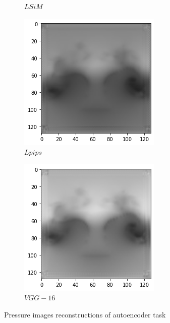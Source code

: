 \documentclass[a4paper,12pt,twoside]{report}
\begin{document}
\begin{figure}
\begin{subfigure}{0.19\textwidth}
		\caption{$LSiM$}
	\end{subfigure}
	\begin{subfigure}{0.19\textwidth}
		\centering
		\includegraphics[scale=0.29]{autoencoder/lpips1.png}
		\caption{$Lpips$}
	\end{subfigure}
	\begin{subfigure}{0.19\textwidth}
		\centering
		\includegraphics[scale=0.29]{autoencoder/vgg1.png}
		\caption{$VGG-16$}
	\end{subfigure}
	\caption{Pressure images reconstructions of autoencoder task}
	\label{autoencoder pressure outputs}
\end{figure}
\end{document}
